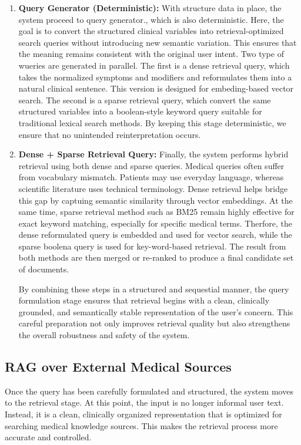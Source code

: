 \documentclass[conference, anonymous]{IEEEtran}
\begin{document}
\begin{enumerate}
    \item \textbf{Query Generator (Deterministic):} With structure data in place, the system proceed to query generator., which is also deterministic. Here, the goal is to convert the structured clinical variables into retrieval-optimized search queries without introducing new semantic variation. This ensures that the meaning remains consistent with the original user intent. Two type of wueries are generated in parallel. The first is a dense retrieval query, which takes the normalized symptoms and modifiers and reformulates  them into a natural clinical sentence. This version is designed for embeding-based vector search. The second is a sparse retrieval query, which convert the same structured variables into a boolean-style keyword query suitable for traditional lexical search methods. By keeping this stage deterministic, we ensure that no unintended reinterpretation occurs.
    
    \item \textbf{Dense + Sparse Retrieval Query:} Finally, the system performs hybrid retrieval using both dense and sparse queries. Medical queries often suffer from vocabulary mismatch. Patients may use everyday language, whereas scientific literature uses technical terminology. Dense retrieval helps bridge this gap by captuing semantic similarity through vector embeddings. At the same time, sparse retrieval method such as BM25 remain highly effective for exact keyword matching, especially for specific medical terms. Therfore, the dense reformulated query is embedded and used for vector search, while the sparse boolena query is used for key-word-based retrieval. The result from both methods are then merged or re-ranked to produce a final candidate set of documents.

    By combining these steps in a structured and sequestial manner, the query formulation stage ensures  that retrieval begins with a clean, clinically grounded, and semantically stable representation of the user's concern. This careful preparation not only improves retrieval quality but also strengthens the overall robustness and safety of the system.
\end{enumerate}

\subsection{RAG over External Medical Sources}
\label{subsec: rag-externalsources}

Once the query has been carefully formulated and structured, the system moves to the retrieval stage. At this point, the input is no longer informal user text. Instead, it is a clean, clinically organized representation that is optimized for searching medical knowledge sources. This makes the retrieval process more accurate and controlled. 
\end{document}

